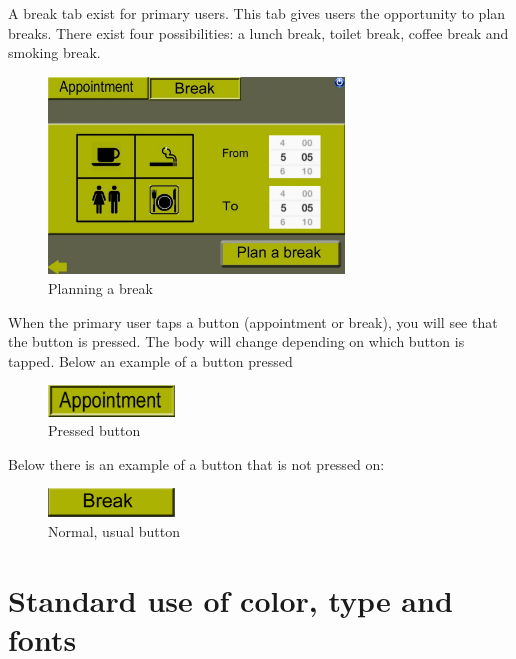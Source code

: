 \documentclass[11pt, a4paper,svglistings]{report}
\begin{document}
\newpage

A break tab exist for primary users. This tab gives users the opportunity to plan breaks. There exist four possibilities: a lunch break, toilet break, coffee break and smoking break.

\begin{figure}[H]
\centering
    \includegraphics[width=0.7\textwidth]{Break.jpg}
  \caption[Take a break]{Planning a break}
\end{figure}

When the primary user taps a button (appointment or break), you will see that the button is pressed. The body will change depending on which button is tapped. Below an example of a button pressed

\begin{figure}[H]
\centering
    \includegraphics[width=0.3\textwidth]{AppointmentButton.png}
  \caption[Button pressed]{Pressed button}
\end{figure}

Below there is an example of a button that is not pressed on: 

\begin{figure}[H]
\centering
    \includegraphics[width=0.3\textwidth]{BreakButton.png}
  \caption[Normal button]{Normal, usual button}
\end{figure}

\newpage

\section{Standard use of color, type and fonts}
\end{document}
